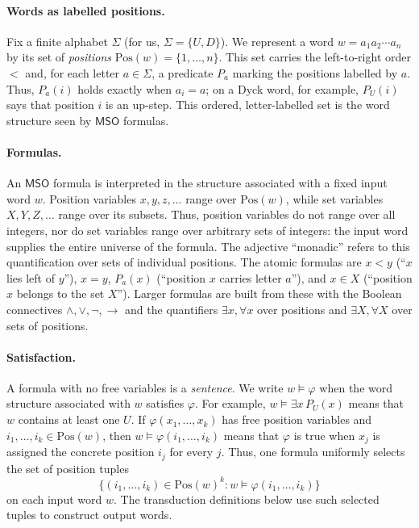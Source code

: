 \documentclass[11pt]{article}
\theoremstyle{definition}
\newcommand{\MSO}{\mathsf{MSO}}
\begin{document}
\paragraph{Words as labelled positions.}
Fix a finite alphabet $\Sigma$ (for us, $\Sigma=\{U,D\}$).  We represent a word
$w=a_1a_2\cdots a_n$ by its set of \emph{positions}
$\mathrm{Pos}(w)=\{1,\ldots,n\}$.  This set carries the left-to-right order
$<$ and, for each letter $a\in\Sigma$, a predicate $P_a$ marking the
positions labelled by $a$.  Thus, $P_a(i)$ holds exactly when $a_i=a$; on a
Dyck word, for example, $P_U(i)$ says that position $i$ is an up-step.  This
ordered, letter-labelled set is the word structure seen by $\MSO$ formulas.

\paragraph{Formulas.}
An $\MSO$ formula is interpreted in the structure associated with a fixed
input word $w$.  Position variables $x,y,z,\ldots$ range over
$\mathrm{Pos}(w)$, while set variables $X,Y,Z,\ldots$ range over its subsets.
Thus, position variables do not range over all integers, nor do set variables
range over arbitrary sets of integers: the input word supplies the entire
universe of the formula.  The adjective ``monadic'' refers to this
quantification over sets of individual positions.  The atomic formulas are
$x<y$ (``$x$ lies left of $y$''), $x=y$, $P_a(x)$ (``position $x$ carries
letter $a$''), and
$x\in X$ (``position $x$ belongs to the set $X$'').  Larger formulas are built
from these with the Boolean connectives $\wedge,\vee,\neg,\rightarrow$ and the
quantifiers $\exists x,\forall x$ over positions and $\exists X,\forall X$ over
sets of positions.

\paragraph{Satisfaction.}
A formula with no free variables is a \emph{sentence}.  We write
$w\models\varphi$ when the word structure associated with $w$ satisfies
$\varphi$.  For example, $w\models\exists x\,P_U(x)$ means that $w$ contains at
least one $U$.  If
$\varphi(x_1,\ldots,x_k)$ has free position variables and
$i_1,\ldots,i_k\in\mathrm{Pos}(w)$, then
$w\models\varphi(i_1,\ldots,i_k)$ means that $\varphi$ is true when $x_j$ is
assigned the concrete position $i_j$ for every $j$.  Thus, one formula
uniformly selects the
set of position tuples
\[
   \{(i_1,\ldots,i_k)\in\mathrm{Pos}(w)^k : w\models\varphi(i_1,\ldots,i_k)\}
\]
on each input word $w$.  The transduction definitions below use such selected
tuples to construct output words.
\end{document}
